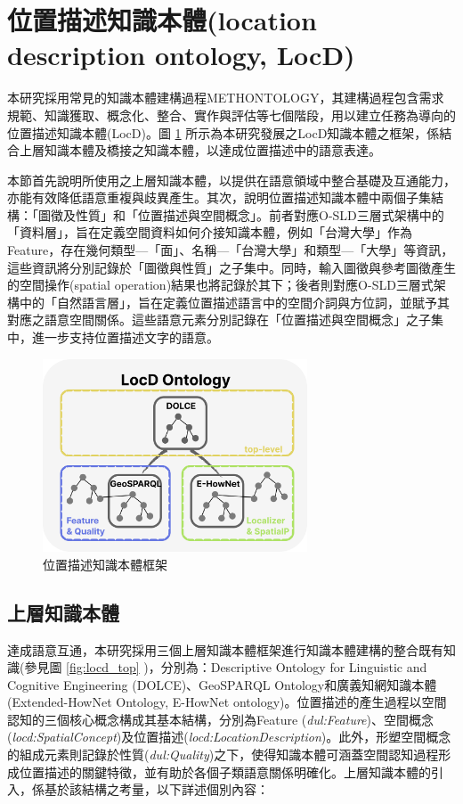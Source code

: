 \section{位置描述知識本體(location description ontology, LocD)}

本研究採用常見的知識本體建構過程METHONTOLOGY\citep{RN143}，其建構過程包含需求規範、知識獲取、概念化、整合、實作與評估等七個階段，用以建立任務為導向的位置描述知識本體(LocD)。圖 \ref{fig:locd_framework} 所示為本研究發展之LocD知識本體之框架，係結合上層知識本體及橋接之知識本體，以達成位置描述中的語意表達。

本節首先說明所使用之上層知識本體，以提供在語意領域中整合基礎及互通能力，亦能有效降低語意重複與歧異產生。其次，說明位置描述知識本體中兩個子集結構：「圖徵及性質」和「位置描述與空間概念」。前者對應O-SLD三層式架構中的「資料層」，旨在定義空間資料如何介接知識本體，例如「台灣大學」作為Feature，存在幾何類型—「面」、名稱—「台灣大學」和類型—「大學」等資訊，這些資訊將分別記錄於「圖徵與性質」之子集中。同時，輸入圖徵與參考圖徵產生的空間操作(spatial operation)結果也將記錄於其下；後者則對應O-SLD三層式架構中的「自然語言層」，旨在定義位置描述語言中的空間介詞與方位詞，並賦予其對應之語意空間關係。這些語意元素分別記錄在「位置描述與空間概念」之子集中，進一步支持位置描述文字的語意。

\begin{figure}[!htbp]
\centering
\includegraphics[width = 0.7\textwidth]{figures/Locd_framework.png}
\caption{位置描述知識本體框架}
\label{fig:locd_framework}
\end{figure}

\subsection{上層知識本體}

達成語意互通，本研究採用三個上層知識本體框架進行知識本體建構的整合既有知識(參見圖 \ref{fig:locd_top} )，分別為：Descriptive Ontology for Linguistic and Cognitive Engineering (DOLCE)、GeoSPARQL Ontology和廣義知網知識本體(Extended-HowNet Ontology, E-HowNet ontology)。位置描述的產生過程以空間認知的三個核心概念構成其基本結構，分別為Feature (\textit{dul:Feature})、空間概念(\textit{locd:SpatialConcept})及位置描述(\textit{locd:LocationDescription})。此外，形塑空間概念的組成元素則記錄於性質(\textit{dul:Quality})之下，使得知識本體可涵蓋空間認知過程形成位置描述的關鍵特徵，並有助於各個子類語意關係明確化。上層知識本體的引入，係基於該結構之考量，以下詳述個別內容：

